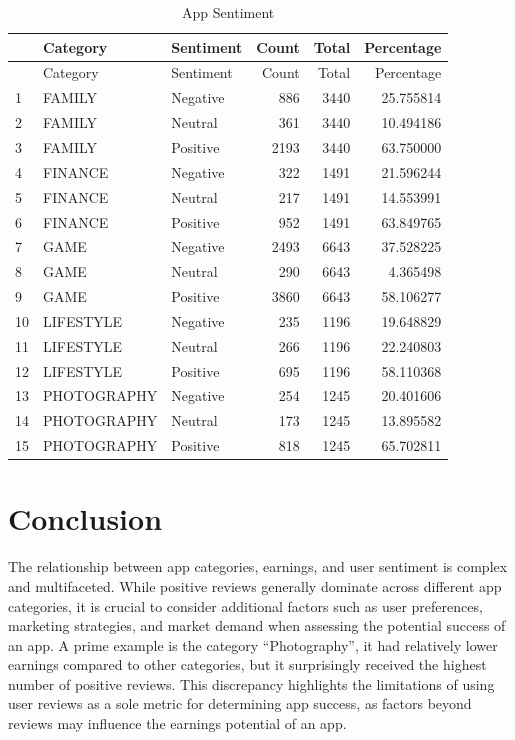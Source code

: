 \documentclass[11pt,preprint, authoryear]{elsarticle}
\numberwithin{equation}{section}
\numberwithin{figure}{section}
\numberwithin{table}{section}
\begin{document}
\begin{longtable}[]{@{}lllrrr@{}}
\caption{App Sentiment}\tabularnewline
\toprule()
& Category & Sentiment & Count & Total & Percentage \\
\midrule()
\endfirsthead
\toprule()
& Category & Sentiment & Count & Total & Percentage \\
\midrule()
\endhead
1 & FAMILY & Negative & 886 & 3440 & 25.755814 \\
2 & FAMILY & Neutral & 361 & 3440 & 10.494186 \\
3 & FAMILY & Positive & 2193 & 3440 & 63.750000 \\
4 & FINANCE & Negative & 322 & 1491 & 21.596244 \\
5 & FINANCE & Neutral & 217 & 1491 & 14.553991 \\
6 & FINANCE & Positive & 952 & 1491 & 63.849765 \\
7 & GAME & Negative & 2493 & 6643 & 37.528225 \\
8 & GAME & Neutral & 290 & 6643 & 4.365498 \\
9 & GAME & Positive & 3860 & 6643 & 58.106277 \\
10 & LIFESTYLE & Negative & 235 & 1196 & 19.648829 \\
11 & LIFESTYLE & Neutral & 266 & 1196 & 22.240803 \\
12 & LIFESTYLE & Positive & 695 & 1196 & 58.110368 \\
13 & PHOTOGRAPHY & Negative & 254 & 1245 & 20.401606 \\
14 & PHOTOGRAPHY & Neutral & 173 & 1245 & 13.895582 \\
15 & PHOTOGRAPHY & Positive & 818 & 1245 & 65.702811 \\
\bottomrule()
\end{longtable}

\hfill

\hypertarget{conclusion}{%
\section{Conclusion}\label{conclusion}}

The relationship between app categories, earnings, and user sentiment is
complex and multifaceted. While positive reviews generally dominate
across different app categories, it is crucial to consider additional
factors such as user preferences, marketing strategies, and market
demand when assessing the potential success of an app. A prime example
is the category ``Photography'', it had relatively lower earnings
compared to other categories, but it surprisingly received the highest
number of positive reviews. This discrepancy highlights the limitations
of using user reviews as a sole metric for determining app success, as
factors beyond reviews may influence the earnings potential of an app.


\end{document}
